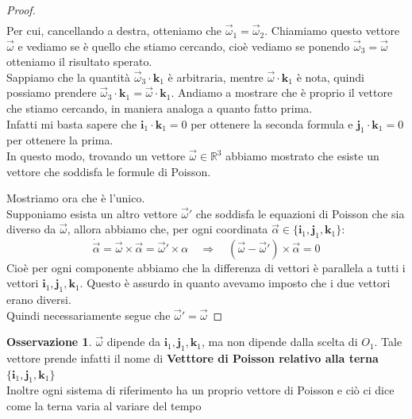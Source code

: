 \documentclass[11pt,a4paper,twoside]{article}
\theoremstyle{definition}
\newtheorem*{oss}{Osservazione}
\begin{document}
\begin{proof}
\begin{align*}
	\end{align*}
	Per cui, cancellando a destra, otteniamo che $\vec \omega_1 = \vec \omega_2$. Chiamiamo questo vettore $\vec \omega$ e vediamo se è quello che stiamo cercando, cioè vediamo se ponendo $\vec \omega_3 = \vec \omega$ otteniamo il risultato sperato.\\
	Sappiamo che la quantità $\vec \omega_3 \cdot \mathbf k_1$ è arbitraria, mentre $\vec \omega \cdot \mathbf k_1$ è nota, quindi possiamo prendere $\vec\omega_3 \cdot \mathbf k_1 = \vec \omega \cdot \mathbf k_1$. Andiamo a mostrare che è proprio il vettore che stiamo cercando, in maniera analoga a quanto fatto prima.\\
	Infatti mi basta sapere che $\mathbf i_1 \cdot \mathbf k_1 = 0$ per ottenere la seconda formula e $\mathbf j_1 \cdot \mathbf k_1 =0$ per ottenere la prima.\\
	In questo modo, trovando un vettore $\vec \omega \in \mathbb R^3$ abbiamo mostrato che esiste un vettore che soddisfa le formule di Poisson.

	Mostriamo ora che è l'unico.\\
	Supponiamo esista un altro vettore $\vec \omega'$ che soddisfa le equazioni di Poisson che sia diverso da $\vec \omega$, allora abbiamo che, per ogni coordinata $\vec \alpha \in \{\mathbf i_1, \mathbf j_1, \mathbf k_1\}$:
	\[ \dot{\vec \alpha} = \vec \omega \times \vec \alpha = \vec \omega' \times \alpha \quad \Rightarrow \quad (\vec \omega - \vec \omega') \times \vec \alpha = 0 \]
	Cioè per ogni componente abbiamo che la differenza di vettori è parallela a tutti i vettori $\mathbf i_1, \mathbf j_1, \mathbf k_1$. Questo è assurdo in quanto avevamo imposto che i due vettori erano diversi.\\
	Quindi necessariamente segue che $\vec \omega' = \vec \omega$
\end{proof}

\begin{oss}
	$\vec \omega$ dipende da $\mathbf i_1, \mathbf j_1, \mathbf k_1$, ma non dipende dalla scelta di $O_1$. Tale vettore prende infatti il nome di \textbf{Vetttore di Poisson relativo alla terna} $\{\mathbf i_1, \mathbf j_1, \mathbf k_1\}$\\
	Inoltre ogni sistema di riferimento ha un proprio vettore di Poisson e ciò ci dice come la terna varia al variare del tempo
\end{oss}
\end{document}
